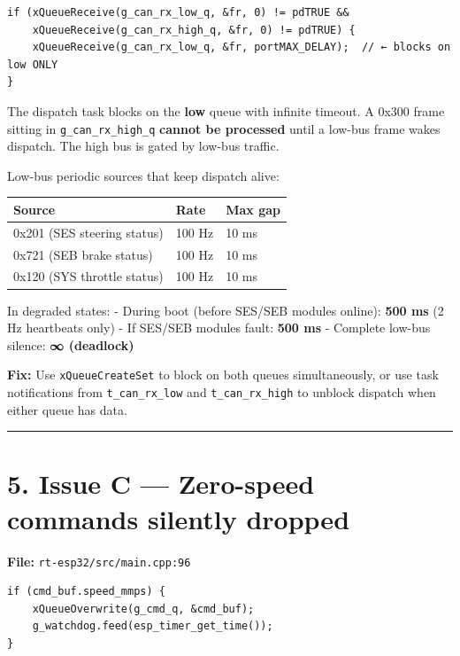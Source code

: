 \documentclass[12pt,a4paper,oneside]{report}
\begin{document}
\begin{verbatim}
if (xQueueReceive(g_can_rx_low_q, &fr, 0) != pdTRUE &&
    xQueueReceive(g_can_rx_high_q, &fr, 0) != pdTRUE) {
    xQueueReceive(g_can_rx_low_q, &fr, portMAX_DELAY);  // ← blocks on low ONLY
}
\end{verbatim}

The dispatch task blocks on the \textbf{low} queue with infinite timeout. A
0x300 frame sitting in \texttt{g\_can\_rx\_high\_q} \textbf{cannot be processed}
until a low-bus frame wakes dispatch. The high bus is gated by low-bus traffic.

Low-bus periodic sources that keep dispatch alive:

\begin{longtable}[]{@{}lll@{}}
\toprule\noalign{}
Source & Rate & Max gap \\
\midrule\noalign{}
\endhead
\bottomrule\noalign{}
\endlastfoot
0x201 (SES steering status) & 100 Hz & 10 ms \\
0x721 (SEB brake status) & 100 Hz & 10 ms \\
0x120 (SYS throttle status) & 100 Hz & 10 ms \\
\end{longtable}

In degraded states: - During boot (before SES/SEB modules online): \textbf{500
ms} (2 Hz heartbeats only) - If SES/SEB modules fault: \textbf{500 ms} -
Complete low-bus silence: \textbf{∞ (deadlock)}

\textbf{Fix:} Use \texttt{xQueueCreateSet} to block on both queues
simultaneously, or use task notifications from \texttt{t\_can\_rx\_low} and
\texttt{t\_can\_rx\_high} to unblock dispatch when either queue has data.

\begin{center}\rule{0.5\linewidth}{0.5pt}\end{center}

\section{5. Issue C --- Zero-speed commands silently
dropped}\label{issue-c-zero-speed-commands-silently-dropped}

\textbf{File:} \texttt{rt-esp32/src/main.cpp:96}

\begin{verbatim}
if (cmd_buf.speed_mmps) {
    xQueueOverwrite(g_cmd_q, &cmd_buf);
    g_watchdog.feed(esp_timer_get_time());
}
\end{verbatim}
\end{document}
